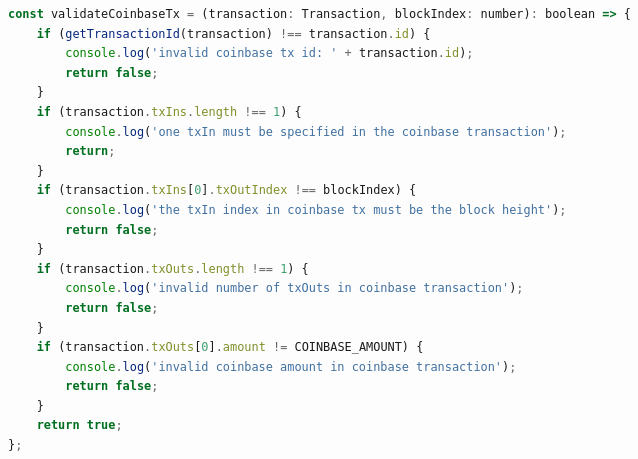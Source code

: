 \documentclass{article}
\begin{document}
\begin{lstlisting}[language=JavaScript, caption={Проверка транзакции coinbase.}]
const validateCoinbaseTx = (transaction: Transaction, blockIndex: number): boolean => {
	if (getTransactionId(transaction) !== transaction.id) {
		console.log('invalid coinbase tx id: ' + transaction.id);
		return false;
	}
	if (transaction.txIns.length !== 1) {
		console.log('one txIn must be specified in the coinbase transaction');
		return;
	}
	if (transaction.txIns[0].txOutIndex !== blockIndex) {
		console.log('the txIn index in coinbase tx must be the block height');
		return false;
	}
	if (transaction.txOuts.length !== 1) {
		console.log('invalid number of txOuts in coinbase transaction');
		return false;
	}
	if (transaction.txOuts[0].amount != COINBASE_AMOUNT) {
		console.log('invalid coinbase amount in coinbase transaction');
		return false;
	}
	return true;
};
\end{lstlisting}

\begin{thebibliography}{9}

	  \emph{}

\end{thebibliography}
\end{document}
